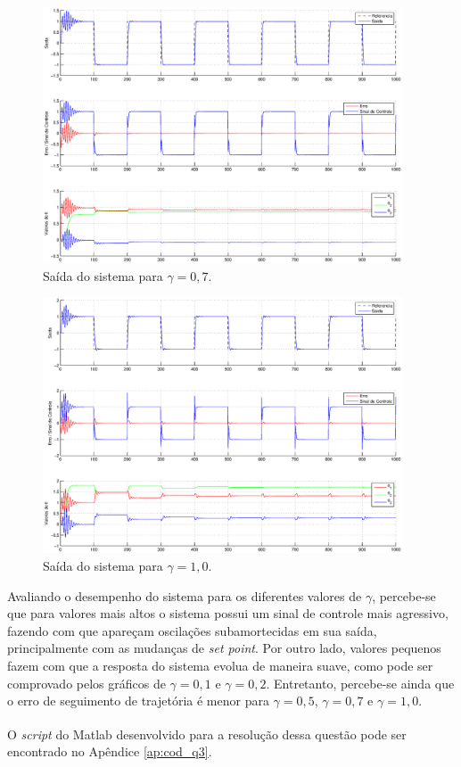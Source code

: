 \begin{figure}[htb]
    \centering
    \includegraphics[width=0.95\textwidth]{imgs/questao3/saida_gamma_0.7.eps}
    \caption{Saída do sistema para $\gamma = 0,7$.}
    \label{fig:q3_saida_gamma_0.7}
\end{figure}

\begin{figure}[H]
    \centering
    \includegraphics[width=0.95\textwidth]{imgs/questao3/saida_gamma_1.0.eps}
    \caption{Saída do sistema para $\gamma = 1,0$.}
    \label{fig:q3_saida_gamma_1.0}
\end{figure}

Avaliando o desempenho do sistema para os diferentes valores de $\gamma$,
percebe-se que para valores mais altos o sistema possui um sinal de controle
mais agressivo, fazendo com que apareçam oscilações subamortecidas em sua
saída, principalmente com as mudanças de {\it set point}. Por outro lado,
valores pequenos fazem com que a resposta do sistema evolua de maneira suave,
como pode ser comprovado pelos gráficos de $\gamma = 0,1$ e $\gamma = 0,2$.
Entretanto, percebe-se ainda que o erro de seguimento de trajetória é menor para
$\gamma = 0,5$, $\gamma = 0,7$ e $\gamma = 1,0$.

O {\it script} do Matlab\textsuperscript{\textregistered} desenvolvido para a
resolução dessa questão pode ser encontrado no Apêndice \ref{ap:cod_q3}.
